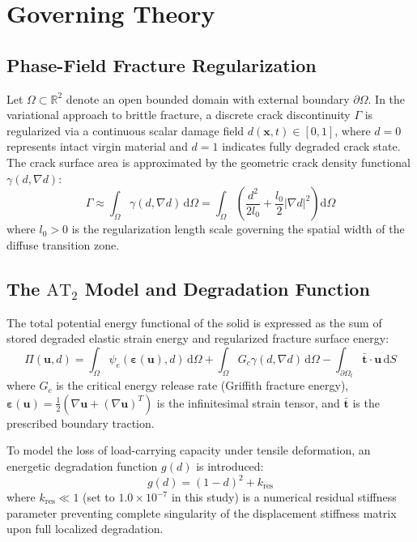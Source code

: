 \documentclass[11pt,a4paper]{article}
\begin{document}
\section{Governing Theory}

\subsection{Phase-Field Fracture Regularization}
Let $\Omega \subset \mathbb{R}^2$ denote an open bounded domain with external boundary $\partial\Omega$. In the variational approach to brittle fracture, a discrete crack discontinuity $\Gamma$ is regularized via a continuous scalar damage field $d(\mathbf{x}, t) \in [0, 1]$, where $d=0$ represents intact virgin material and $d=1$ indicates fully degraded crack state. The crack surface area is approximated by the geometric crack density functional $\gamma(d, \nabla d)$:
\begin{equation}
    \Gamma \approx \int_\Omega \gamma(d, \nabla d)\,\mathrm{d}\Omega = \int_\Omega \left( \frac{d^2}{2l_0} + \frac{l_0}{2} |\nabla d|^2 \right) \mathrm{d}\Omega
    \label{eq:crack_density}
\end{equation}
where $l_0 > 0$ is the regularization length scale governing the spatial width of the diffuse transition zone.

\subsection{The $\mathrm{AT}_2$ Model and Degradation Function}
The total potential energy functional of the solid is expressed as the sum of stored degraded elastic strain energy and regularized fracture surface energy:
\begin{equation}
    \Pi(\mathbf{u}, d) = \int_\Omega \psi_e(\boldsymbol{\varepsilon}(\mathbf{u}), d)\,\mathrm{d}\Omega + \int_\Omega G_c \gamma(d, \nabla d)\,\mathrm{d}\Omega - \int_{\partial\Omega_t} \bar{\mathbf{t}}\cdot\mathbf{u}\,\mathrm{d}S
    \label{eq:total_potential}
\end{equation}
where $G_c$ is the critical energy release rate (Griffith fracture energy), $\boldsymbol{\varepsilon}(\mathbf{u}) = \frac{1}{2}(\nabla\mathbf{u} + (\nabla\mathbf{u})^T)$ is the infinitesimal strain tensor, and $\bar{\mathbf{t}}$ is the prescribed boundary traction.

To model the loss of load-carrying capacity under tensile deformation, an energetic degradation function $g(d)$ is introduced:
\begin{equation}
    g(d) = (1 - d)^2 + k_{\mathrm{res}}
    \label{eq:degradation_func}
\end{equation}
where $k_{\mathrm{res}} \ll 1$ (set to $1.0\times 10^{-7}$ in this study) is a numerical residual stiffness parameter preventing complete singularity of the displacement stiffness matrix upon full localized degradation.
\end{document}
